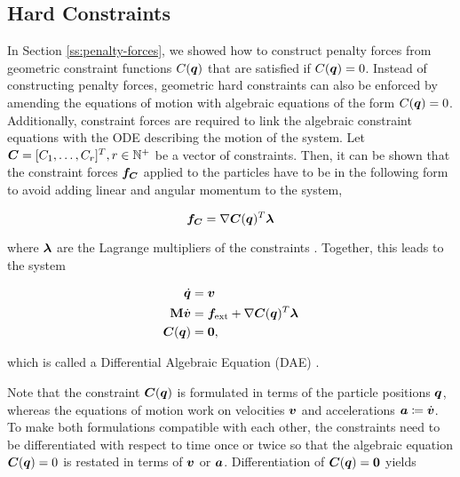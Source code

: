 \subsection{Hard Constraints}\label{ss:hard-constraints}
In Section \ref{ss:penalty-forces}, we showed how to construct penalty forces from geometric constraint functions $C(\bm{q})$ that 
are satisfied if $C(\bm{q}) = 0$. Instead of constructing penalty forces, geometric hard constraints can also be enforced by amending the 
equations of motion with algebraic equations of the form $C(\bm{q}) = 0$. Additionally, constraint forces are required to link the algebraic 
constraint equations with the ODE describing the motion of the system. Let $\bm{C} = [C_1, \ldots, C_r]^T, r \in \mathbb{N}^+$ 
be a vector of constraints. Then, it can be shown that the constraint forces $\bm{f_C}$ applied to the particles have to be in the following form to 
avoid adding linear and angular momentum to the system,

\begin{equation}\label{eq:constraint-forces}
    \bm{f_C} = \nabla \bm{C}(\bm{q})^T \bm{\lambda}
\end{equation}

\noindent where $\bm{\lambda}$ are the Lagrange multipliers of the constraints \cite{baraff1996}. Together, this leads to the system

\begin{equation}\label{eq:hard-dae}
\begin{split}
    \dot{\bm{q}} &= \bm{v} \\
    \mathbf{M}\dot{\bm{v}} &= \bm{f}_\text{ext} + \nabla \bm{C}(\bm{q})^T\bm{\lambda} \\
    \bm{C}(\bm{q}) &= \bm{0},
\end{split}
\end{equation}

\noindent which is called a Differential Algebraic Equation (DAE) \cite{ascher1995, baraff1996}. 

Note that the constraint $\bm{C}(\bm{q})$ is formulated 
in terms of the particle positions $\bm{q}$, whereas the equations of motion work on velocities $\bm{v}$ and accelerations $\bm{a} \coloneqq \dot{\bm{v}}$. 
To make both formulations compatible with each other, the constraints need to be differentiated with respect to time once or twice so that 
the algebraic equation $\bm{C}(\bm{q}) = 0$ is restated in terms of $\bm{v}$ or $\bm{a}$. Differentiation of $\bm{C}(\bm{q}) = \bm{0}$ yields

